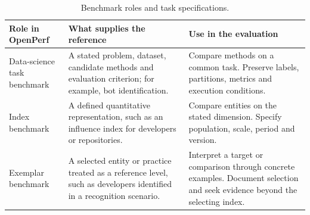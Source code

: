 \begin{table}[tbp]
\caption{Benchmark roles and task specifications.}
\label{tab:ch3-benchmarks}
\begingroup\fontsize{9.2}{11.8}\selectfont
\renewcommand{\arraystretch}{1.12}
\begin{tabularx}{\textwidth}{@{}>{\raggedright\arraybackslash}p{23mm}>{\raggedright\arraybackslash}X >{\raggedright\arraybackslash}X@{}}
\toprule
\textbf{Role in OpenPerf} & \textbf{What supplies the reference} & \textbf{Use in the evaluation}\\
\midrule
Data-science task benchmark & A stated problem, dataset, candidate methods and evaluation criterion; for example, bot identification. & Compare methods on a common task. Preserve labels, partitions, metrics and execution conditions.\\[5pt]
Index benchmark & A defined quantitative representation, such as an influence index for developers or repositories. & Compare entities on the stated dimension. Specify population, scale, period and version.\\[5pt]
Exemplar benchmark & A selected entity or practice treated as a reference level, such as developers identified in a recognition scenario. & Interpret a target or comparison through concrete examples. Document selection and seek evidence beyond the selecting index.\\
\bottomrule
\end{tabularx}
\endgroup
{}
\end{table}
